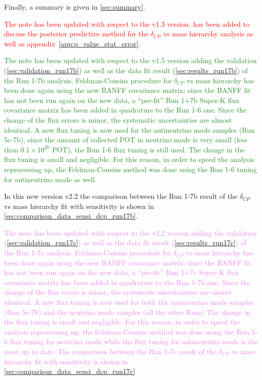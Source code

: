 
Finally, a summary is given in \cref{sec:summary}.  

\textcolor{red}{
The note has been updated with respect to the v1.3 version.  has been added
to discuss the posterior predictive method for the $\delta_{CP}$ vs mass hierarchy analysis as well as
appendix~\ref{app:p_value_stat_error}.
}

\textcolor{ForestGreen}{
The note has been updated with respect to the v1.5 version adding the validation (\cref{sec:validation_run17b})
as well as the data fit result (\cref{sec:results_run17b}) of the Run 1-7b analysis.
Feldman-Cousins procedure for $\delta_{CP}$ vs mass hierarchy has been done again using the new BANFF covariance matrix:
since the BANFF fit has not been run again on the new data, a ``pre-fit'' Run 1+7b Super-K flux covariance matrix has been added in quadrature
to the Run 1-6 one. Since the change of the flux errors is minor, the systematic uncertainties are almost identical.
A new flux tuning is now used for the antineutrino mode samples (Run 5c-7b), since the amount of collected POT
in neutrino mode is very small (less than $0.1 \times 10^{20}$ POT), the Run 1-6 flux tuning is still used. 
The change in the flux tuning is small and negligible.
For this reason, in order to speed the analysis reprocessing up, the Feldman-Cousins method was done using the 
Run 1-6 tuning for antineutrino mode as well.
}

\textcolor{BurntOrange}{
In this new version v2.2 the comparison between the Run 1-7b result 
of the $\delta_{CP}$ vs mass hierarchy fit with sensitivity is shown in \cref{sec:comparison_data_sensi_dcp_run17b}.
}

\textcolor{Violet}{
The note has been updated with respect to the v2.2 version adding the validation (\cref{sec:validation_run17c})
as well as the data fit result (\cref{sec:results_run17c}) of the Run 1-7c analysis.
Feldman-Cousins procedure for $\delta_{CP}$ vs mass hierarchy has been done again using the new BANFF covariance matrix:
since the BANFF fit has not been run again on the new data, a ``pre-fit'' Run 1+7c Super-K flux covariance matrix has been added in quadrature
to the Run 1-7b one. Since the change of the flux errors is minor, the systematic uncertainties are almost identical.
A new flux tuning is now used for both the antineutrino mode samples (Run 5c-7b)
and the neutrino mode samples (all the other Runs)
The change in the flux tuning is small and negligible.
For this reason, in order to speed the analysis reprocessing up, the Feldman-Cousins method was done using the 
Run 1-6 flux tuning for neutrino mode while the flux tuning for antineutrino mode is the most up to date.
The comparison between the Run 1-7c result 
of the $\delta_{CP}$ vs mass hierarchy fit with sensitivity is shown in \cref{sec:comparison_data_sensi_dcp_run17c}.
} \\

